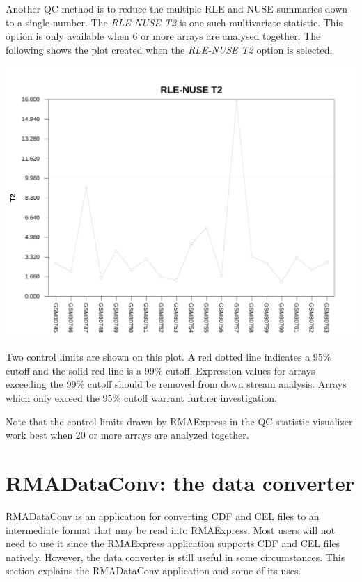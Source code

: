 \documentclass[11pt]{report}
\begin{document}
Another QC method is to reduce the multiple RLE and NUSE summaries down to a single number. The {\it RLE-NUSE T2} is one such multivariate statistic. This option is only available when 6 or more arrays are analysed together. The following shows the plot created when the {\it RLE-NUSE T2} option is selected.
\begin{center}
\includegraphics[scale=0.4]{RLE_NUSE_T2.pdf}
\end{center}
Two control limits are shown on this plot. A red dotted line indicates a 95\% cutoff and the solid red line is a 99\% cutoff. Expression values for arrays exceeding the 99\% cutoff should be removed from down stream analysis. Arrays which only exceed the 95\% cutoff warrant further investigation.


Note that the control limits drawn by RMAExpress in the QC statistic visualizer work best when 20 or more arrays are analyzed together.


\chapter{RMADataConv: the data converter} \label{chap:RMADataConv}

RMADataConv is an application for converting CDF and CEL files to an intermediate format that may be read into RMAExpress. Most users will not need to use it since the RMAExpress application supports CDF and CEL files natively. However, the data converter is still useful in some circumstances. This section explains the RMADataConv application and some of its uses. %
\end{document}
